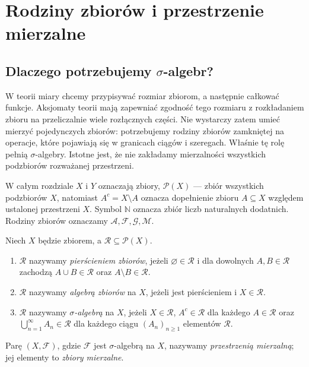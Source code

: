 \chapter{Rodziny zbiorów i przestrzenie mierzalne}
\label{ch:przestrzenie-mierzalne}

\section{Dlaczego potrzebujemy \texorpdfstring{$\sigma$}{sigma}-algebr?}

W teorii miary chcemy przypisywać rozmiar zbiorom, a następnie całkować funkcje.
Aksjomaty teorii mają zapewniać zgodność tego rozmiaru z rozkładaniem zbioru
na przeliczalnie wiele rozłącznych części. Nie wystarczy zatem umieć mierzyć
pojedynczych zbiorów: potrzebujemy rodziny zbiorów zamkniętej na operacje,
które pojawiają się w granicach ciągów i szeregach. Właśnie tę rolę pełnią
$\sigma$-algebry. Istotne jest, że nie zakładamy mierzalności wszystkich
podzbiorów rozważanej przestrzeni.

W całym rozdziale $X$ i $Y$ oznaczają zbiory, $\mathcal P(X)$ --- zbiór
wszystkich podzbiorów $X$, natomiast $A^c=X\setminus A$ oznacza dopełnienie
zbioru $A\subseteq X$ względem ustalonej przestrzeni $X$. Symbol $\mathbb N$
oznacza zbiór liczb naturalnych dodatnich. Rodziny zbiorów oznaczamy
$\mathcal A,\mathcal F,\mathcal G,\mathcal M$.

\begin{definicja}
\label{def:algebry}
Niech $X$ będzie zbiorem, a $\mathcal R\subseteq\mathcal P(X)$.
\begin{enumerate}
\item $\mathcal R$ nazywamy \emph{pierścieniem zbiorów}, jeżeli
$\varnothing\in\mathcal R$ i dla dowolnych $A,B\in\mathcal R$ zachodzą
$A\cup B\in\mathcal R$ oraz $A\setminus B\in\mathcal R$.
\item $\mathcal R$ nazywamy \emph{algebrą zbiorów} na $X$, jeżeli jest
pierścieniem i $X\in\mathcal R$.
\item $\mathcal R$ nazywamy \emph{$\sigma$-algebrą} na $X$, jeżeli
$X\in\mathcal R$, $A^c\in\mathcal R$ dla każdego $A\in\mathcal R$ oraz
$\bigcup_{n=1}^{\infty}A_n\in\mathcal R$ dla każdego ciągu
$(A_n)_{n\geq1}$ elementów $\mathcal R$.
\end{enumerate}
Parę $(X,\mathcal F)$, gdzie $\mathcal F$ jest $\sigma$-algebrą na $X$,
nazywamy \emph{przestrzenią mierzalną}; jej elementy to \emph{zbiory
mierzalne}.
\end{definicja}


